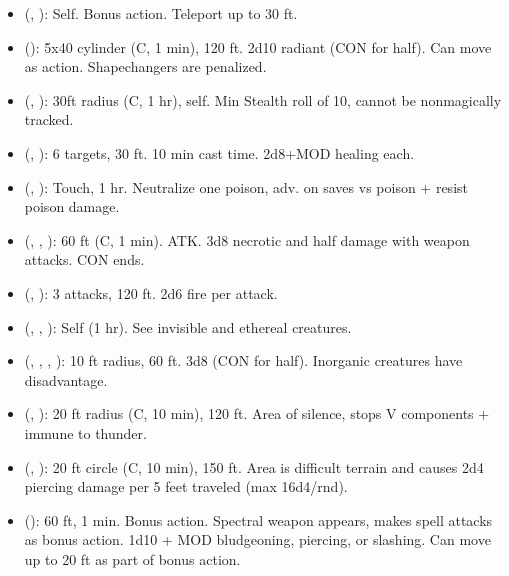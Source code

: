 \begin{itemize}
	\item {} (, ): Self. Bonus action. Teleport up to 30 ft.
	\item {} (): 5x40 cylinder (C, 1 min), 120 ft. 2d10 radiant (CON for half). Can move as action. Shapechangers are penalized.
	\item {} (, ): 30ft radius (C, 1 hr), self. Min Stealth roll of 10, cannot be nonmagically tracked.
	\item {} (, ): 6 targets, 30 ft. 10 min cast time. 2d8+MOD healing each.
	\item {} (, ): Touch, 1 hr. Neutralize one poison, adv. on saves vs poison + resist poison damage.
	\item {} (, , ): 60 ft (C, 1 min). ATK. 3d8 necrotic and half damage with weapon attacks. CON ends.
	\item {} (, ): 3 attacks, 120 ft. 2d6 fire per attack.
	\item {} (, , ): Self (1 hr). See invisible and ethereal creatures.
	\item {} (, , , ): 10 ft radius, 60 ft. 3d8 (CON for half). Inorganic creatures have disadvantage.
	\item {} (, ): 20 ft radius (C, 10 min), 120 ft. Area of silence, stops V components + immune to thunder.
	\item {} (, ): 20 ft circle (C, 10 min), 150 ft. Area is difficult terrain and causes 2d4 piercing damage per 5 feet traveled (max 16d4/rnd).
	\item {} (): 60 ft, 1 min. Bonus action. Spectral weapon appears, makes spell attacks as bonus action. 1d10 + MOD bludgeoning, piercing, or slashing. Can move up to 20 ft as part of bonus action.

\end{itemize}
